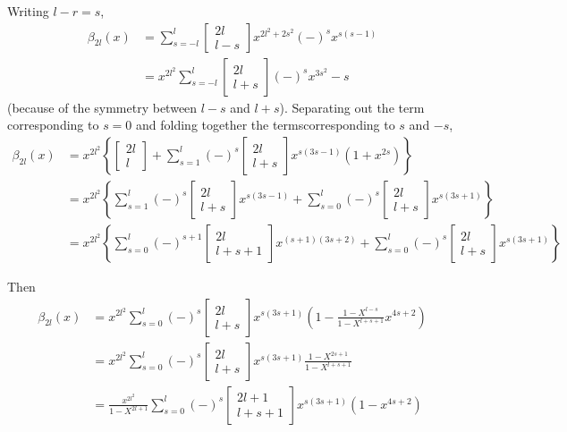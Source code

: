 Writing $l-r=s$, 
\begin{align*}
  \beta_{2l} (x) & = \sum^l_{s=-l} \begin{bmatrix}
    2l\\l-s \end{bmatrix} x^{2l^2 + 2s^2} (-)^s x^{s(s-1)}\\
  & = x^{2l^2} \sum^l_{s=-l} \begin{bmatrix} 2l\\ l+s \end{bmatrix}
  (-)^s x^{3 s^2} -s 
\end{align*}
(because of the symmetry between $l-s$ and $l+s$). Separating out the
term corresponding  to $s=0$ and folding together the
terms\pageoriginale corresponding to $s$ and $-s$,
\begin{align*}
  \beta_{2l}(x) & = x^{2l^2} \left\{ \begin{bmatrix}
    2l\\l\end{bmatrix} + \sum^l_{s=1} (-)^s \begin{bmatrix}
      2l\\l+s \end{bmatrix} x^{s(3s-1)} (1+x^{2s})\right\}\\
    & = x^{2l^2} \left\{ \sum^l_{s=1}
    (-)^s \begin{bmatrix}2l\\l+s\end{bmatrix} x^{s(3s-1)}+
      \sum^l_{s=0} (-)^s \begin{bmatrix} 2l\\l+s \end{bmatrix}
      x^{s(3s+1)}\right\}\\
      & = x^{2l^2} \left\{ \sum^l_{s=0} (-)^{s+1} \begin{bmatrix}
        2l\\l+s+1 \end{bmatrix} x^{(s+1) (3s+2)} + \sum^l_{s=0}
      (-)^s \begin{bmatrix} 2l\\l+s\end{bmatrix} x^{s(3s+1)} \right\}
        \tag{4}\label{part1:lec7:eq4} 
\end{align*}

Then
\begin{align*}
  \beta_{2l} (x) & = x^{2l^2} \sum^l_{s=0} (-)^s\begin{bmatrix}
  2l\\l+s\end{bmatrix} x^{s(3s+1)} \left( 1-
  \frac{1-X^{l-s}}{1-X^{l+s+1}} x^{4s+2} \right)\\
  & = x^{2l^2} \sum^l_{s=0} (-)^s \begin{bmatrix} 2l\\l+s\end{bmatrix}
    x^{s(3s+1)} \frac{1-X^{2s+1}}{1-X^{l+s+1}}\\
    & = \frac{x^{2l^2}}{1-X^{2l+1}} \sum^l_{s=0} (-)^s \begin{bmatrix}
      2l+1\\l+s+1\end{bmatrix} x^{s(3s+1)} (1-x^{4s+2})
      \tag{5}\label{part1:lec7:eq5} 
\end{align*}


